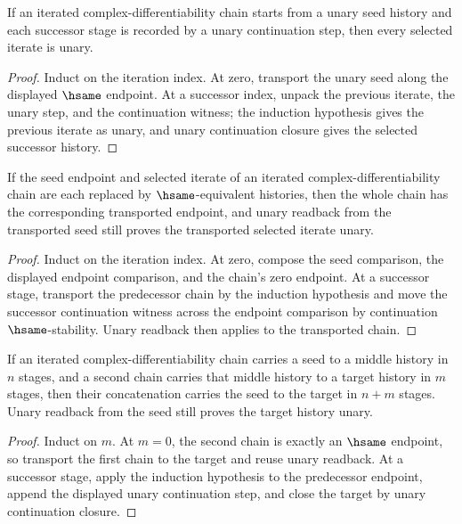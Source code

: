 \begin{lemma}
\label{lem:iterated-cplx-diff-unary-of-seed}
If an iterated complex-differentiability chain starts from a unary seed history and each successor stage is recorded by a unary continuation step, then every selected iterate is unary.
\end{lemma}
\begin{proof}
Induct on the iteration index. At zero, transport the unary seed along the displayed $\hsame$ endpoint. At a successor index, unpack the previous iterate, the unary step, and the continuation witness; the induction hypothesis gives the previous iterate as unary, and unary continuation closure gives the selected successor history.
\end{proof}

\begin{theorem}
\label{thm:iterated-cplx-diff-hsame-transport-unary-readback}
If the seed endpoint and selected iterate of an iterated complex-differentiability chain are each replaced by $\hsame$-equivalent histories, then the whole chain has the corresponding transported endpoint, and unary readback from the transported seed still proves the transported selected iterate unary.
\end{theorem}
\begin{proof}
Induct on the iteration index. At zero, compose the seed comparison, the displayed endpoint comparison, and the chain's zero endpoint. At a successor stage, transport the predecessor chain by the induction hypothesis and move the successor continuation witness across the endpoint comparison by continuation $\hsame$-stability. Unary readback then applies to the transported chain.
\end{proof}

\begin{theorem}
\label{thm:iterated-cplx-diff-add-closed-unary-readback}
If an iterated complex-differentiability chain carries a seed to a middle
history in $n$ stages, and a second chain carries that middle history to a
target history in $m$ stages, then their concatenation carries the seed to
the target in $n+m$ stages. Unary readback from the seed still proves the
target history unary.
\end{theorem}
\begin{proof}
Induct on $m$. At $m=0$, the second chain is exactly an $\hsame$ endpoint,
so transport the first chain to the target and reuse unary readback. At a
successor stage, apply the induction hypothesis to the predecessor endpoint,
append the displayed unary continuation step, and close the target by unary
continuation closure.
\end{proof}

